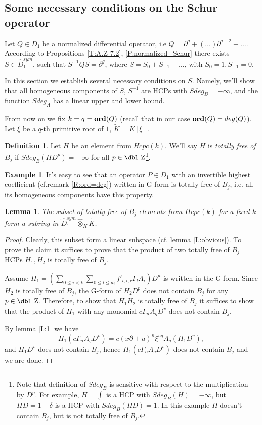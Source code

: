 \documentclass[11pt]{article}
\theoremstyle{definition}
\newcommand{\dz}{{\mbox{\dbl Z}}}
\newcommand{\Ord}{\mathop {\rm \bf ord}}
\newtheorem{Def}{Definition}[section]
\newtheorem{ex}{Example}[section]
\theoremstyle{plain}
\newtheorem{lemma}{Lemma}[section]
\numberwithin{equation}{section}
\begin{document}
\subsection{Some necessary conditions on the Schur operator}
\label{S:necessary conditions on the Schur}


Let $Q\in D_1$ be a normalized differential operator, i.e $Q=\partial^q+(\dots)\partial^{q-2}+\dots$. According to Propositions \ref{T:A.Z 7.2}, \ref{P:normalized_Schur} there exists $S\in \hat{D}_{1}^{sym}$, such that $S^{-1}QS=\partial^q$, where $S=S_{0}+S_{-1}+\dots$, with $S_{0}=1,S_{-1}=0$. 

In this section we establish several necessary conditions on $S$. Namely, we'll show that all homogeneous components of $S$, $S^{-1}$ are HCPs with $Sdeg_B=-\infty$, and the function $Sdeg_A$ has a linear upper and lower bound. 

From now on we fix $k=q=\Ord(Q)$ (recall that in our case $\Ord(Q)=deg (Q)$). Let $\xi$ be a $q$-th primitive root of $1$, $\tilde{K}=K[\xi ]$.

\begin{Def}
\label{D:total_B}
Let $H$ be an element from $Hcpc(k)$. We'll say $H$ is {\it totally free of $B_j$} if $Sdeg_B(HD^p)=-\infty$ for all $p\in\dz$\footnote{Note that definition of $Sdeg_B$ is sensitive with respect to the multiplication by $D^p$. For example, $H=\int$ is a HCP with $Sdeg_B(H)=-\infty$, but $HD= 1-\delta$ is a HCP with $Sdeg_B(HD)=1$. In this example $H$ doesn't contain $B_j$, but is not totally free of $B_j$.}. 
\end{Def}

\begin{ex}
\label{Ex:dif_op_total_B}
It's easy to see that an operator $P\in D_1$ with an invertible highest coefficient (cf.remark \ref{R:ord=deg}) written in G-form is totally free of $B_j$, i.e. all its homogeneous components have this property. 
\end{ex}

\begin{lemma}
\label{L:total_B}
The subset of totally free of $B_j$ elements from $Hcpc(k)$ for a fixed $k$ form a subring in $\hat{D}_1^{sym}\hat{\otimes}_K\tilde{K}$. 
\end{lemma}

\begin{proof}
Clearly, this subset form a linear subspace (cf. lemma \ref{L:obvious}). To prove the claim it suffices to prove that the product of two totally free of $B_j$ HCPs $H_1, H_2$ is totally free of $B_j$. 

Assume $H_1=(\sum_{0\leq i<k}\sum_{0\leq l\leq d_i} f'_{l,i;r}\Gamma_lA_i)D^u$ is written in the G-form. 
Since $H_2$ is totally free of $B_j$, the G-form of $H_2D^{p}$ does not contain $B_j$ for any $p\in \dz$. Therefore, to show that $H_1H_2$ is totally free of $B_j$ it suffices to show that the product of $H_1$ with any monomial $c\Gamma_{n}A_{q}D^{v}$ does not contain $B_j$. 

By lemma \ref{L:1} we have 
$$
H_1(c\Gamma_{n}A_{q}D^{v})= c(x\partial +u)^n\xi^{uq}A_q(H_1D^v),
$$
and $H_1D^v$ does not contain $B_j$, hence $H_1(c\Gamma_{n}A_{q}D^{v})$ does not contain $B_j$ and we are done.
\end{proof}
\end{document}
